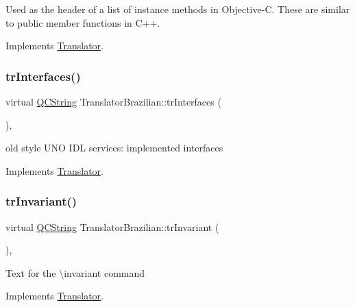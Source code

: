Used as the header of a list of instance methods in Objective-\/C. These are similar to public member functions in C++. 

Implements \mbox{\hyperlink{class_translator}{Translator}}.

\mbox{\label{class_translator_brazilian_ac9b77c3549f6537d9a02cc578773f141}} 
\subsubsection{\texorpdfstring{trInterfaces()}{trInterfaces()}}
{\footnotesize\ttfamily virtual \mbox{\hyperlink{class_q_c_string}{Q\+C\+String}} Translator\+Brazilian\+::tr\+Interfaces (\begin{DoxyParamCaption}{ }\end{DoxyParamCaption})\hspace{0.3cm}{\ttfamily [inline]}, {\ttfamily [virtual]}}

old style U\+NO I\+DL services\+: implemented interfaces 

Implements \mbox{\hyperlink{class_translator}{Translator}}.

\mbox{\label{class_translator_brazilian_aaf0cc05b9291e8732ae8c92bb30085fe}} 
\subsubsection{\texorpdfstring{trInvariant()}{trInvariant()}}
{\footnotesize\ttfamily virtual \mbox{\hyperlink{class_q_c_string}{Q\+C\+String}} Translator\+Brazilian\+::tr\+Invariant (\begin{DoxyParamCaption}{ }\end{DoxyParamCaption})\hspace{0.3cm}{\ttfamily [inline]}, {\ttfamily [virtual]}}

Text for the \textbackslash{}invariant command 

Implements \mbox{\hyperlink{class_translator}{Translator}}.

\mbox{\label{class_translator_brazilian_a5be1b523566054372d2e8cd238963ea5}} 
